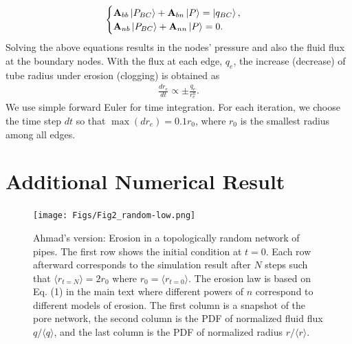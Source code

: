 \documentclass[%
 amsmath,amssymb,
prstper,
]{revtex4-2}
\begin{document}
%
\begin{align}
    \begin{cases} 
        \mathbf{A}_{bb} \ket{P_{BC}} + \mathbf{A}_{bn}  \ket{P} = \ket{q_{BC}}, \\
    \mathbf{A}_{nb}\ket{P_{BC}} +  \mathbf{A}_{nn} \ket{P} = 0. 
    \end{cases} 
    \label{eq:main-network}
\end{align}
%
Solving the above equations results in the nodes' pressure and also the fluid flux at the boundary nodes. With the flux at each edge, $q_e$, the increase (decrease) of tube radius under erosion (clogging) is obtained as 
%
\begin{align}
    \frac{dr_e}{dt} \propto \pm  \frac{q_e}{r_e^n}.
\end{align}
%
We use simple forward Euler for time integration. For each iteration, we choose the time step $dt$ so that $\max(dr_e) = 0.1 r_0$, where $r_0$ is the smallest radius among all edges.

\newpage
\section{Additional Numerical Result}
%
\begin{figure}[h]
    \texttt{[image: Figs/Fig2\_random-low.png]}
    \caption{Ahmad's version: Erosion in a topologically random network of pipes. The first row shows the initial condition at $t=0$. Each row afterward corresponds to the simulation result after $N$ steps such that $\langle r_{t=N}\rangle=2r_0$ where $r_0 = \langle r_{t=0}\rangle$. The erosion law is based on Eq. (1) in the main text where different powers of $n$ correspond to different models of erosion. The first column is a snapshot of the pore network, the second column is the PDF of normalized fluid flux $q/\langle q \rangle$, and the last column is the PDF of normalized radius $r/\langle r\rangle$.}\label{fig:fig2}
\end{figure}
%

\newpage
\end{document}
